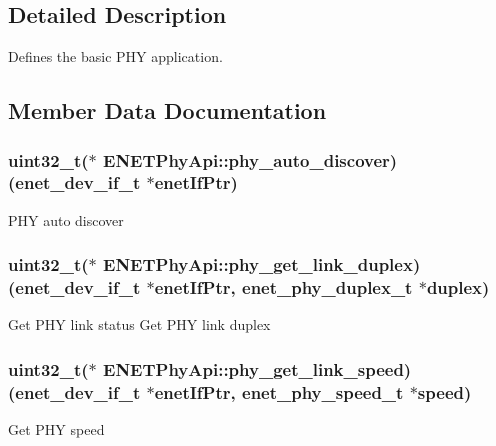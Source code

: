 \subsection{Detailed Description}
Defines the basic P\+HY application. 

\subsection{Member Data Documentation}
\subsubsection[{\texorpdfstring{phy\+\_\+auto\+\_\+discover}{phy_auto_discover}}]{\setlength{\rightskip}{0pt plus 5cm}uint32\+\_\+t($\ast$  E\+N\+E\+T\+Phy\+Api\+::phy\+\_\+auto\+\_\+discover) ({\bf enet\+\_\+dev\+\_\+if\+\_\+t} $\ast$enet\+If\+Ptr)}\hypertarget{structENETPhyApi_a5fb7842a439ac8f88c02a6a459cb200d}{}\label{structENETPhyApi_a5fb7842a439ac8f88c02a6a459cb200d}
P\+HY auto discover 
\subsubsection[{\texorpdfstring{phy\+\_\+get\+\_\+link\+\_\+duplex}{phy_get_link_duplex}}]{\setlength{\rightskip}{0pt plus 5cm}uint32\+\_\+t($\ast$  E\+N\+E\+T\+Phy\+Api\+::phy\+\_\+get\+\_\+link\+\_\+duplex) ({\bf enet\+\_\+dev\+\_\+if\+\_\+t} $\ast$enet\+If\+Ptr, {\bf enet\+\_\+phy\+\_\+duplex\+\_\+t} $\ast$duplex)}\hypertarget{structENETPhyApi_ad74440bb9244e9174a6633b27a8b4e68}{}\label{structENETPhyApi_ad74440bb9244e9174a6633b27a8b4e68}
Get P\+HY link status Get P\+HY link duplex 
\subsubsection[{\texorpdfstring{phy\+\_\+get\+\_\+link\+\_\+speed}{phy_get_link_speed}}]{\setlength{\rightskip}{0pt plus 5cm}uint32\+\_\+t($\ast$  E\+N\+E\+T\+Phy\+Api\+::phy\+\_\+get\+\_\+link\+\_\+speed) ({\bf enet\+\_\+dev\+\_\+if\+\_\+t} $\ast$enet\+If\+Ptr, {\bf enet\+\_\+phy\+\_\+speed\+\_\+t} $\ast$speed)}\hypertarget{structENETPhyApi_a0e89a40c3e647f68471bc61b14629750}{}\label{structENETPhyApi_a0e89a40c3e647f68471bc61b14629750}
Get P\+HY speed 
